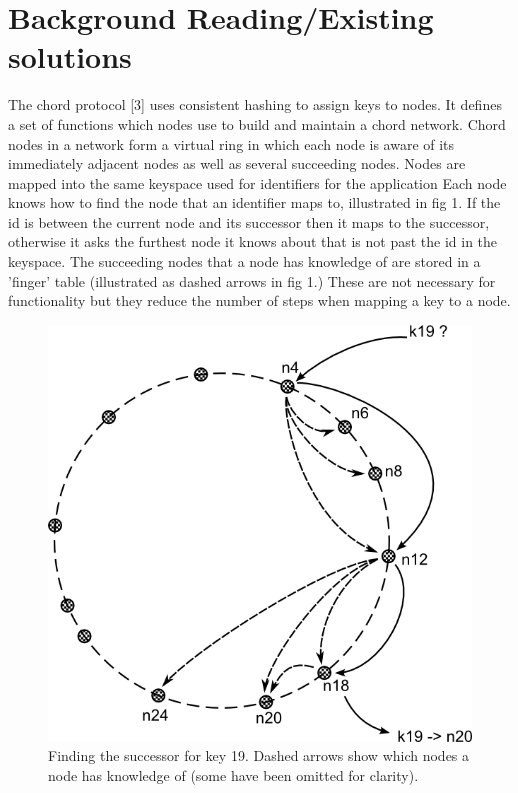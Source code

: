 \documentclass{article}
\begin{document}
\section{Background Reading/Existing solutions}
The chord protocol [3] uses consistent hashing to assign keys to nodes. It defines a set of functions which nodes use to build and maintain a chord network. Chord nodes in a network form a virtual ring in which each node is aware of its immediately adjacent nodes as well as several succeeding nodes.
Nodes are mapped into the same keyspace used for identifiers for the application
Each node knows how to find the node that an identifier maps to, illustrated in fig 1. If the id is between the current node and its successor then it maps to the successor, otherwise it asks the furthest node it knows about that is not past the id in the keyspace. The succeeding nodes that a node has knowledge of are stored in a 'finger' table (illustrated as dashed arrows in fig 1.) These are not necessary for functionality but they reduce the number of steps when mapping a key to a node.
\begin{figure}
\centering
\includegraphics{chord_find-successor.png}
\caption{Finding the successor for key 19. Dashed arrows show which nodes a node has knowledge of (some have been omitted for clarity).}
\end{figure}
\end{document}
